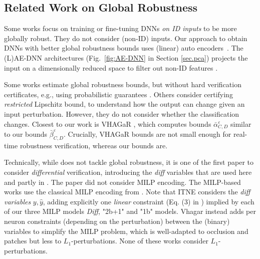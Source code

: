 \subsection{Related Work on Global Robustness}

%
Some works \cite{Leino,Zhang22a,Sun22,Chen21,REGLO} focus on training or fine-tuning DNNs {\em on ID inputs} to be more globally robust. 
They do not consider (non-ID) inputs.
Our approach to obtain DNNs with better global robustness bounds uses (linear) auto encoders~\cite{hinton2006reducing}.
The (L)AE-DNN architectures (Fig.~\ref{fig:AE-DNN} in Section \ref{sec.pca}) projects the input on a dimensionally reduced space to filter out non-ID features \cite{aggarwalOutlierAnalysis2017}.

Some works \cite{Bastani16,Ruan19,Gopinath18} estimate global robustness bounds, but without hard verification certificates, e.g., using probabilistic guarantees \cite{Levy23,Mangal19}.
Others \cite{Marabou,lipshitz,ITNE,GROCET} consider certifying {\em restricted} Lipschitz bound, to understand how the output can change given an input perturbation. However, they do not consider whether the classification changes. 
%
Closest to our work is VHAGaR \cite{vhagar}, which computes 
bounds $\bar{\alpha}^\varepsilon_{C,D}$ similar to our bounds 
$\bar{\beta}^\varepsilon_{C,D}$.
Crucially, VHAGaR bounds are not small enough for real-time robustness verification, whereas our bounds are. 

Technically, while \cite{diff} does not tackle global robustness, it is one of the first paper to consider {\em differential} verification, introducing the {\em diff} variables that are used here and partly in \cite{ITNE}. 
The paper \cite{diff} did not consider MILP encoding.
The MILP-based works \cite{vhagar,lipshitz,ITNE} 
use the classical MILP encoding from \cite{MILP}.
Note that ITNE \cite{ITNE} considers the {\em diff variables} $y,\hat{y}$, adding explicitly one {\em linear} constraint (Eq. (3) in \cite{ITNE})
implied by each of our three MILP models {\em Diff}, "2b+1" and "1b" models. Vhagar \cite{vhagar} instead adds per neuron constraints (depending on the perturbation) between the (binary) variables to simplify the MILP problem, which is well-adapted to occlusion and patches but less to $L_1$-perturbations.
None of these works consider $L_1$-perturbations.




